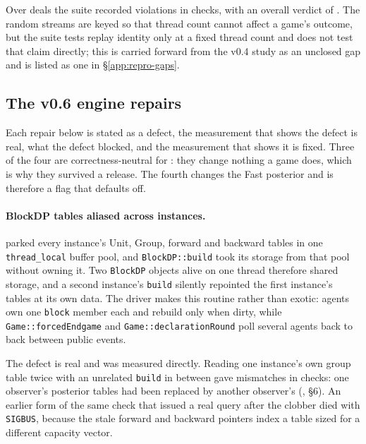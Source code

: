 Over \vsixVerifyGames{} deals the suite recorded \vsixAuditViolations{}
violations in \vsixAuditChecks{} checks, with an overall verdict of
\vsixVerify{}. The random streams are keyed so that thread count cannot affect a
game's outcome, but the suite tests replay identity only at a fixed thread count
and does not test that claim directly; this is carried forward from the v0.4
study as an unclosed gap and is listed as one in \S\ref{app:repro-gaps}.

\subsection{The v0.6 engine repairs}
\label{sec:engine-repairs}

Each repair below is stated as a defect, the measurement that shows the defect is
real, what the defect blocked, and the measurement that shows it is fixed. Three
of the four are correctness-neutral for \vfive{}: they change nothing a \vfive{}
game does, which is why they survived a release. The fourth changes the Fast
posterior and is therefore a flag that defaults off.

\paragraph{BlockDP tables aliased across instances.}
 parked every instance's Unit, Group, forward
and backward tables in one \verb|thread_local| buffer pool, and
\texttt{BlockDP::build} took its storage from that pool without owning it. Two
\texttt{BlockDP} objects alive on one thread therefore shared storage, and a
second instance's \texttt{build} silently repointed the first instance's tables
at its own data. The driver makes this routine rather than exotic: agents own one
\texttt{block} member each and rebuild only when dirty, while
\texttt{Game::forcedEndgame} and \texttt{Game::declarationRound} poll several
agents back to back between public events.

The defect is real and was measured directly. Reading one instance's own group
table twice with an unrelated \texttt{build} in between gave
\numAliasMismatch{} mismatches in \numAliasChecks{} checks: one observer's
posterior tables had been replaced by another observer's
(, \S6). An earlier form of
the same check that issued a real query after the clobber died with
\texttt{SIGBUS}, because the stale forward and backward pointers index a table
sized for a different capacity vector.

